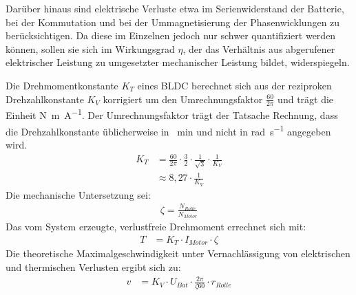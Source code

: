 	Darüber hinaus sind elektrische Verluste etwa im Serienwiderstand der Batterie, bei der Kommutation und bei der Ummagnetisierung der Phasenwicklungen zu berücksichtigen.
	Da diese im Einzelnen jedoch nur schwer quantifiziert werden können, sollen sie sich im Wirkungsgrad \(\eta\), der das Verhältnis aus abgerufener elektrischer Leistung zu umgesetzter mechanischer Leistung bildet, widerspiegeln.\par\medskip
	Die Drehmomentkonstante \(K_T\) eines BLDC berechnet sich aus der reziproken Drehzahlkonstante \(K_V\) korrigiert um den Umrechnungsfaktor \(\frac{60}{2\pi}\) und trägt die Einheit \unit{\newton\metre\per\ampere}.
	Der Umrechnungsfaktor trägt der Tatsache Rechnung, dass die Drehzahlkonstante üblicherweise in \unit{\per\minute} und nicht in \unit{\radian\per\second} angegeben wird\cite{DalY.Ohm.2000}.
	\begin{align}
		K_T	&= \frac{60}{2\pi} \cdot \frac{3}{2} \cdot \frac{1}{\sqrt{3}} \cdot \frac{1}{K_V} \nonumber \\
			&\approx 8,27 \cdot \frac{1}{K_V}
		\label{eq:kv to kt}
	\end{align}
	Die mechanische Untersetzung sei:
	\begin{align}
		\zeta = \frac{N_{Rolle}}{N_{Motor}}
		\label{eq:reduction}
	\end{align}
	Das vom System erzeugte, verlustfreie Drehmoment errechnet sich mit:
	\begin{align}
		T	&= K_T \cdot I_{Motor} \cdot \zeta
		\label{eq:frictionless torque}
	\end{align}
	Die theoretische Maximalgeschwindigkeit unter Vernachlässigung von elektrischen und thermischen Verlusten ergibt sich zu:
	\begin{align}
		v	&= K_V \cdot U_{Bat} \cdot \frac{2\pi}{\zeta 60} \cdot r_{Rolle}
		\label{eq:kv rating}
	\end{align}
	\nocite{Meschede.2015}\nocite{Demtroder.2018}